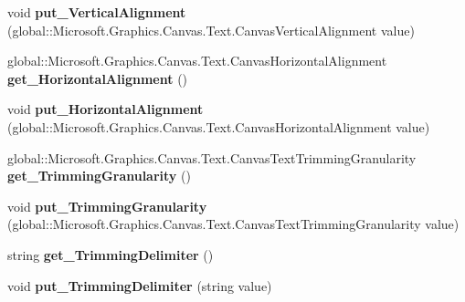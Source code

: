 \begin{DoxyCompactItemize}
void {\bfseries put\+\_\+\+Vertical\+Alignment} (global\+::\+Microsoft.\+Graphics.\+Canvas.\+Text.\+Canvas\+Vertical\+Alignment value)
\item 
\mbox{\label{class_microsoft_1_1_graphics_1_1_canvas_1_1_text_1_1_canvas_text_format_aada5eeeefb336038b13a36fa1c2eafda}} 
global\+::\+Microsoft.\+Graphics.\+Canvas.\+Text.\+Canvas\+Horizontal\+Alignment {\bfseries get\+\_\+\+Horizontal\+Alignment} ()
\item 
\mbox{\label{class_microsoft_1_1_graphics_1_1_canvas_1_1_text_1_1_canvas_text_format_a41dba6b94d37a3688961e2aaf678a2e6}} 
void {\bfseries put\+\_\+\+Horizontal\+Alignment} (global\+::\+Microsoft.\+Graphics.\+Canvas.\+Text.\+Canvas\+Horizontal\+Alignment value)
\item 
\mbox{\label{class_microsoft_1_1_graphics_1_1_canvas_1_1_text_1_1_canvas_text_format_ae84dccbd2abc45d77d283e369c1d8033}} 
global\+::\+Microsoft.\+Graphics.\+Canvas.\+Text.\+Canvas\+Text\+Trimming\+Granularity {\bfseries get\+\_\+\+Trimming\+Granularity} ()
\item 
\mbox{\label{class_microsoft_1_1_graphics_1_1_canvas_1_1_text_1_1_canvas_text_format_acf017333af07452d3399503df70a2ad3}} 
void {\bfseries put\+\_\+\+Trimming\+Granularity} (global\+::\+Microsoft.\+Graphics.\+Canvas.\+Text.\+Canvas\+Text\+Trimming\+Granularity value)
\item 
\mbox{\label{class_microsoft_1_1_graphics_1_1_canvas_1_1_text_1_1_canvas_text_format_a51c4ffa1642d76d5d0490e546132ec41}} 
string {\bfseries get\+\_\+\+Trimming\+Delimiter} ()
\item 
\mbox{\label{class_microsoft_1_1_graphics_1_1_canvas_1_1_text_1_1_canvas_text_format_af89475ea2460707e1f04259bf78eb72f}} 
void {\bfseries put\+\_\+\+Trimming\+Delimiter} (string value)
\item 
\mbox{\label{class_microsoft_1_1_graphics_1_1_canvas_1_1_text_1_1_canvas_text_format_ac993bc984dcc620772bc989f6cc7ab97}} 

\end{DoxyCompactItemize}
